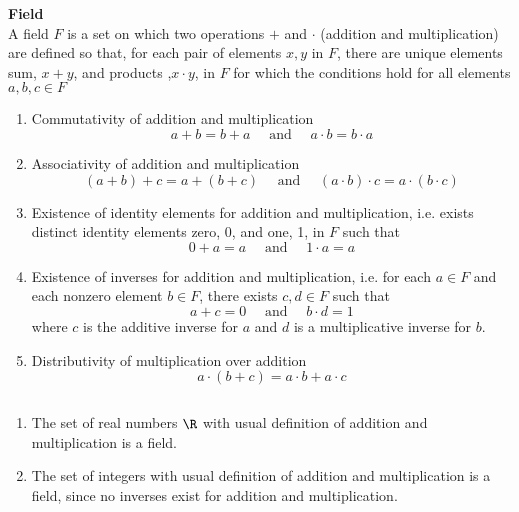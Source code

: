 \documentclass[11pt]{article}
\begin{document}
\begin{defn*} \textbf{Field} \\
A field $F$ is a set on which two operations $+$ and $\cdot$ (addition and multiplication) are defined so that, for each pair of elements $x,y$ in $F$, there are unique elements sum, $x+y$, and products ,$x\cdot y$, in $F$ for which the conditions hold for all elements $a,b,c\in F$
    \begin{enumerate}
        \item Commutativity of addition and multiplication 
        \[
            a + b = b + a \quad \text{ and } \quad 
            a\cdot b = b\cdot a    
        \]
        \item Associativity of addition and multiplication 
        \[
            (a + b) + c = a + (b + c) \quad \text{ and }\quad 
            (a\cdot b)\cdot c = a\cdot (b\cdot c) 
        \]
        \item Existence of identity elements for addition and multiplication, i.e. exists distinct identity elements zero, $0$, and one, 1, in $F$ such that 
        \[
            0 + a = a \quad \text{ and } \quad 
            1 \cdot a = a    
        \]
        \item Existence of inverses for addition and multiplication, i.e. for each $a\in F$ and each nonzero element $b\in F$, there exists $c,d\in F$ such that
        \[
            a + c = 0 \quad \text{ and }\quad 
            b\cdot d = 1
        \]
        where $c$ is the additive inverse for $a$ and $d$ is a multiplicative inverse for $b$. 
        \item Distributivity of multiplication over addition 
        \[
            a\cdot (b+c) = a\cdot b + a\cdot c    
        \]
    \end{enumerate}
    \begin{example}
        $ $\\
        \begin{enumerate}
            \item The set of real numbers $\R$ with usual definition of addition and multiplication is a field. 
            \item The set of integers with usual definition of addition and multiplication is a field, since no inverses exist for addition and multiplication. 
        \end{enumerate}
    \end{example}
\end{defn*}
\end{document}
